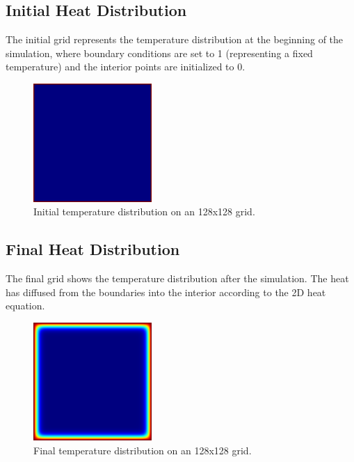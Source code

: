 \documentclass[11pt]{article}
\begin{document}
        \subsection{Initial Heat Distribution}
    The initial grid represents the temperature distribution at the beginning of the simulation, where boundary conditions are set to 1 (representing a fixed temperature) and the interior points are initialized to 0.

    \begin{figure}[ht]
        \centering
        \includegraphics[width=0.4\textwidth]{img/initial_grid.png}
        \caption{Initial temperature distribution on an 128x128 grid.}
        \label{fig:initial_grid}
    \end{figure}

    \subsection{Final Heat Distribution}
    The final grid shows the temperature distribution after the simulation. The heat has diffused from the boundaries into the interior according to the 2D heat equation.

    \begin{figure}[ht]
        \centering
        \includegraphics[width=0.4\textwidth]{img/final_grid.png}
        \caption{Final temperature distribution on an 128x128 grid.}
        \label{fig:final_grid}
    \end{figure}
\end{document}
